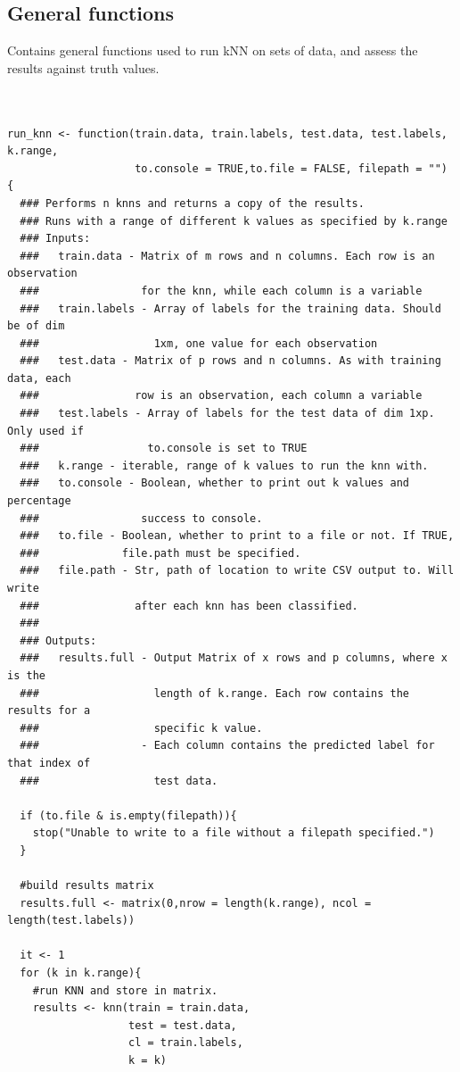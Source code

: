 \documentclass[11pt]{article} %
\begin{document}
\subsection{General functions}
\label{code-general}

Contains general functions used to run kNN on sets of data, and assess the results against truth values.

\begin{lstlisting}


run_knn <- function(train.data, train.labels, test.data, test.labels, k.range, 
                    to.console = TRUE,to.file = FALSE, filepath = "") {
  ### Performs n knns and returns a copy of the results.
  ### Runs with a range of different k values as specified by k.range
  ### Inputs:
  ###   train.data - Matrix of m rows and n columns. Each row is an observation 
  ###                for the knn, while each column is a variable
  ###   train.labels - Array of labels for the training data. Should be of dim 
  ###                  1xm, one value for each observation
  ###   test.data - Matrix of p rows and n columns. As with training data, each 
  ###               row is an observation, each column a variable
  ###   test.labels - Array of labels for the test data of dim 1xp. Only used if 
  ###                 to.console is set to TRUE
  ###   k.range - iterable, range of k values to run the knn with.
  ###   to.console - Boolean, whether to print out k values and percentage 
  ###                success to console.
  ###   to.file - Boolean, whether to print to a file or not. If TRUE,  
  ###             file.path must be specified.
  ###   file.path - Str, path of location to write CSV output to. Will write  
  ###               after each knn has been classified.  
  ###
  ### Outputs:
  ###   results.full - Output Matrix of x rows and p columns, where x is the  
  ###                  length of k.range. Each row contains the results for a 
  ###                  specific k value.
  ###                - Each column contains the predicted label for that index of 
  ###                  test data. 

  if (to.file & is.empty(filepath)){
    stop("Unable to write to a file without a filepath specified.")
  }
  
  #build results matrix
  results.full <- matrix(0,nrow = length(k.range), ncol = length(test.labels))

  it <- 1
  for (k in k.range){
    #run KNN and store in matrix. 
    results <- knn(train = train.data, 
                   test = test.data, 
                   cl = train.labels, 
                   k = k)
    

\end{lstlisting}
\end{document}
